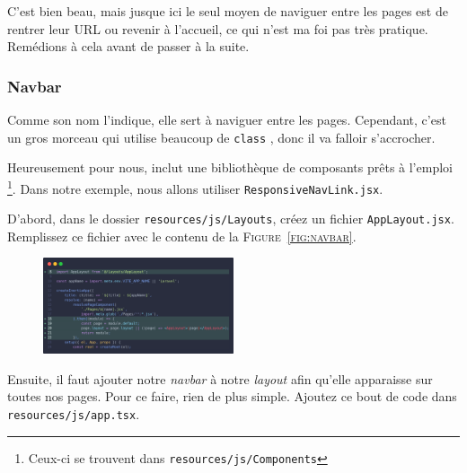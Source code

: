C'est bien beau, mais jusque ici le seul moyen de naviguer entre les pages est de rentrer leur URL ou revenir à l'accueil, ce qui n'est ma foi pas très pratique. Remédions à cela avant de passer à la suite.

\subsubsection[Navbar]{Navbar}\label{sec:navbar}



Comme son nom l'indique, elle sert à naviguer entre les pages. Cependant, c'est un gros morceau qui utilise beaucoup de \verb|class| \tailwind{}, donc il va falloir s'accrocher.

Heureusement pour nous, \react{} inclut une bibliothèque de composants prêts à l'emploi \footnote{Ceux-ci se trouvent dans \texttt{resources/js/Components}}. Dans notre exemple, nous allons utiliser \texttt{ResponsiveNavLink.jsx}.

D'abord, dans le dossier \verb|resources/js/Layouts|, créez un fichier \verb|AppLayout.jsx|. Remplissez ce fichier avec le contenu de la \textsc{Figure~\ref{fig:navbar}}.

\begin{figure}
    \vspace{-1.2cm}
    \includegraphics[width=0.5\textwidth]{figures-C1/app.jsx.png}
\end{figure}

\enlargethispage{2\baselineskip}

Ensuite, il faut ajouter notre \textit{navbar} à notre \textit{layout} afin qu'elle apparaisse sur toutes nos pages. Pour ce faire, rien de plus simple. Ajoutez ce bout de code dans \texttt{resources/js/app.tsx}.


